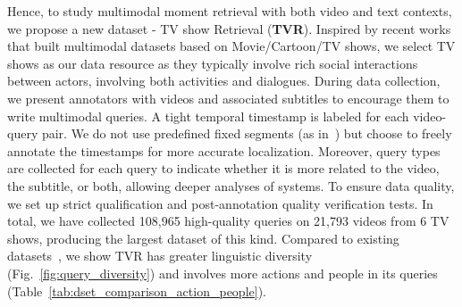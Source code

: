 \documentclass[runningheads]{llncs}
\begin{document}
Hence, to study multimodal moment retrieval with both video and text contexts, we propose a new dataset - TV show Retrieval (\textbf{TVR}).
Inspired by recent works~\cite{tapaswi2016movieqa,kim2017deepstory,Lei2018TVQALC} that built multimodal datasets based on Movie/Cartoon/TV shows,
we select TV shows as our data resource as they typically involve rich social interactions between actors, involving both activities and dialogues.
During data collection, we present annotators with videos and associated subtitles to encourage them to write multimodal queries.
A tight temporal timestamp is labeled for each video-query pair. 
We do not use predefined fixed segments (as in~\cite{anne2017localizing}) but choose to freely annotate the timestamps for more accurate localization. 
Moreover, query types are collected for each query to indicate whether it is more related to the video, the subtitle, or both, allowing deeper analyses of systems.
To ensure data quality, we set up strict qualification and post-annotation quality verification tests.
In total, we have collected 108,965 high-quality queries on 21,793 videos from 6 TV shows, producing the largest dataset of this kind. 
Compared to existing datasets~\cite{anne2017localizing,regneri2013grounding,gao2017tall,Krishna2017DenseCaptioningEI}, we show TVR has greater linguistic diversity (Fig.~\ref{fig:query_diversity}) and involves more actions and people in its queries (Table~\ref{tab:dset_comparison_action_people}).
\end{document}
